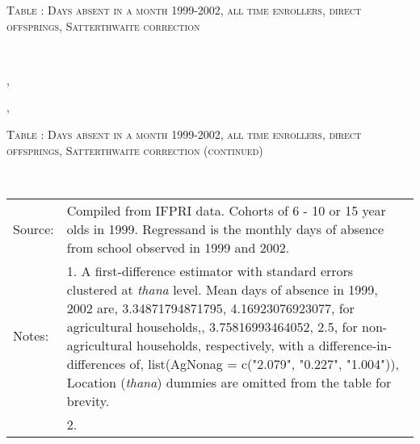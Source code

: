 \begin{table}\hfil\textsc{\footnotesize Table \thetable: Days absent in a month 1999-2002, all time enrollers, direct offsprings, Satterthwaite correction\label{zEm.1999.10.sameN}}\\\setlength{\tabcolsep}{1pt}\renewcommand{\arraystretch}{.675}\hspace{-2em}\hfil{}\\\renewcommand{\arraystretch}{1}\end{table}, \addtocounter{table}{-1}, \begin{table}\hfil\textsc{\footnotesize Table \thetable: Days absent in a month 1999-2002, all time enrollers, direct offsprings, Satterthwaite correction (continued)\label{zEm.1999.10.sameN}}\\\setlength{\tabcolsep}{1pt}\renewcommand{\arraystretch}{.675}\hspace{-2em}\hfil{}\\\renewcommand{\arraystretch}{1}\hfil\begin{tabular}{>{\hfill\scriptsize}p{1cm}<{}>{\scriptsize}p{12cm}<{\hfill}} Source:& Compiled from IFPRI data. Cohorts of 6 - 10 or 15 year olds in 1999. Regressand is the monthly days of absence from school observed in 1999 and 2002. \\[-1ex] Notes:& 1. A first-difference estimator with standard errors clustered at \textit{thana} level. Mean days of absence in 1999, 2002 are, 3.34871794871795, 4.16923076923077, for agricultural households,, 3.75816993464052, 2.5, for non-agricultural households, respectively, with a difference-in-differences of, list(AgNonag = c("2.079", "0.227", "1.004")), Location (\textit{thana}) dummies are omitted from the table for brevity. \\ & 2.   \end{tabular} \end{table}



